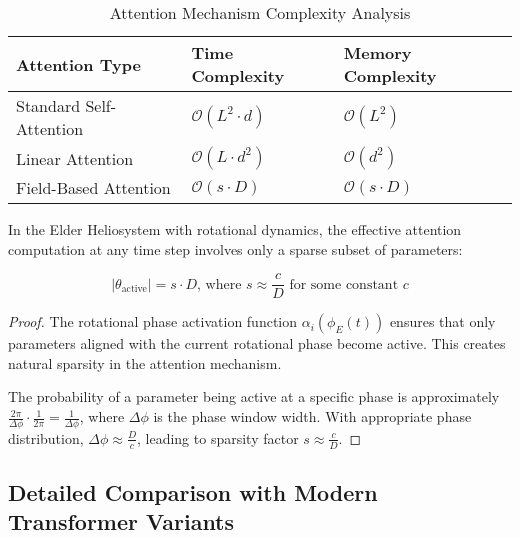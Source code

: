 \begin{table}[ht]
\centering
\caption{Attention Mechanism Complexity Analysis}
\begin{tabular}{|p{4cm}|p{4cm}|p{4cm}|}
\hline
\textbf{Attention Type} & \textbf{Time Complexity} & \textbf{Memory Complexity} \\
\hline
Standard Self-Attention & $\mathcal{O}(L^2 \cdot d)$ & $\mathcal{O}(L^2)$ \\
\hline
Linear Attention & $\mathcal{O}(L \cdot d^2)$ & $\mathcal{O}(d^2)$ \\
\hline
Field-Based Attention & $\mathcal{O}(s \cdot D)$ & $\mathcal{O}(s \cdot D)$ \\
\hline
\end{tabular}
\end{table}

\begin{theorem}
In the Elder Heliosystem with rotational dynamics, the effective attention computation at any time step involves only a sparse subset of parameters:

\begin{equation}
|\theta_{\text{active}}| = s \cdot D \textrm{, where } s \approx \frac{c}{D} \textrm{ for some constant } c
\end{equation}
\end{theorem}

\begin{proof}
The rotational phase activation function $\alpha_i(\phi_E(t))$ ensures that only parameters aligned with the current rotational phase become active. This creates natural sparsity in the attention mechanism.

The probability of a parameter being active at a specific phase is approximately $\frac{2\pi}{\Delta\phi} \cdot \frac{1}{2\pi} = \frac{1}{\Delta\phi}$, where $\Delta\phi$ is the phase window width. With appropriate phase distribution, $\Delta\phi \approx \frac{D}{c}$, leading to sparsity factor $s \approx \frac{c}{D}$.
\end{proof}

\subsection{Detailed Comparison with Modern Transformer Variants}

